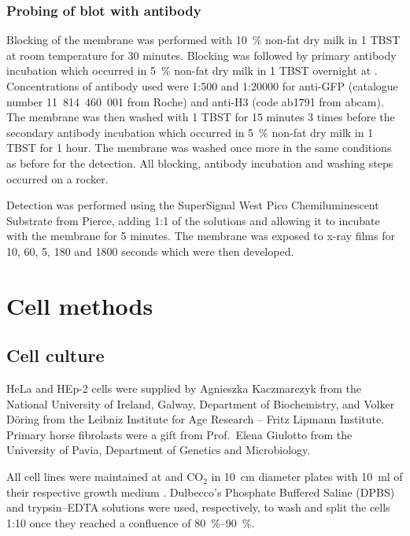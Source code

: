       \subsubsection{Probing of blot with antibody}
        Blocking of the membrane was performed with \SI{10}{\percent}
        non-fat dry milk in \SI{1}{\X} TBST
        at room temperature for 30 minutes. Blocking was followed by
        primary antibody incubation which occurred in \SI{5}{\percent} non-fat
        dry milk in \SI{1}{\X} TBST overnight at . Concentrations of
        antibody used were 1:500 and 1:20000 for anti-GFP (catalogue
        number 11~814~460~001 from Roche) and anti-H3 (code ab1791 from
        abcam). The membrane was then washed with \SI{1}{\X} TBST for
        15 minutes 3 times before the secondary antibody incubation which
        occurred in \SI{5}{\percent} non-fat dry milk in \SI{1}{\X} TBST for
        1 hour. The membrane was washed once more in the same
        conditions as before for the detection. All blocking, antibody
        incubation and washing steps occurred on a rocker.

        Detection was performed using the SuperSignal West Pico Chemiluminescent
        Substrate from Pierce, adding 1:1 of the solutions and allowing it to incubate
        with the membrane for 5 minutes. The membrane was exposed to x-ray films for
        10, 60, 5, 180 and 1800 seconds which were then developed.


  \section{Cell methods}
    \subsection{Cell culture}
      HeLa and HEp-2 cells were supplied by Agnieszka Kaczmarczyk from the
      National University of Ireland, Galway, Department of Biochemistry,
      and Volker D\"oring from the Leibniz Institute for Age Research -- Fritz Lipmann Institute.
      Primary horse fibrolasts were a gift from Prof.~Elena Giulotto from the
      University of Pavia, Department of Genetics and Microbiology.

      All cell lines were maintained at  and  CO$_2$ in \SI{10}{\cm}
      diameter plates with \SI{10}{\ml} of their respective growth
      medium .
      Dulbecco's Phosphate Buffered
      Saline (DPBS) and trypsin--EDTA solutions were used, respectively, to wash
      and split the cells 1:10 once they reached a confluence of \SIrange{80}{90}{\percent}.

